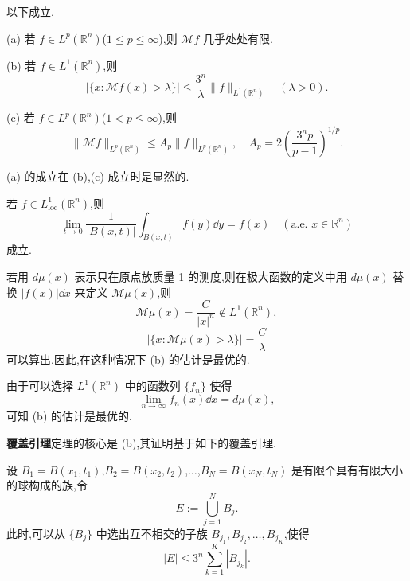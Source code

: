 \begin{theorem}\label{thm:4.1.1}
以下成立.

(a) 若 $f \in L^{p}(\mathbb{R}^{n})$($1 \leq p \leq \infty$),则 $\mathcal{M}f$ 几乎处处有限.

(b) 若 $f \in L^{1}(\mathbb{R}^{n})$,则
\begin{equation*}
|\{x: \mathcal{M}f(x) > \lambda\}| \leq \frac{3^{n}}{\lambda}\|f\|_{L^{1}(\mathbb{R}^{n})} \quad (\lambda > 0).
\end{equation*}

(c) 若 $f \in L^{p}(\mathbb{R}^{n})$($1 < p \leq \infty$),则
\begin{equation*}
\|\mathcal{M}f\|_{L^{p}(\mathbb{R}^{n})} \leq A_{p}\|f\|_{L^{p}(\mathbb{R}^{n})}, \quad A_{p} = 2\left(\frac{3^{n}p}{p-1}\right)^{1/p}.
\end{equation*}

(a) 的成立在 (b),(c) 成立时是显然的.
\end{theorem}

\begin{corollary}\label{cor:4.1.2}
若 $f \in L_{\mathrm{loc}}^{1}(\mathbb{R}^{n})$,则
\begin{equation*}
\lim_{t \to 0}\frac{1}{|B(x,t)|}\int_{B(x,t)}f(y)\dd y = f(x) \quad (\text{a.e. } x \in \mathbb{R}^{n})
\end{equation*}
成立.
\end{corollary}

若用 $d\mu(x)$ 表示只在原点放质量 1 的测度,则在极大函数的定义中用 $d\mu(x)$ 替换 $|f(x)|\dd x$ 来定义 $\mathcal{M}\mu(x)$,则
\begin{equation*}
\mathcal{M}\mu(x) = \frac{C}{|x|^{n}} \notin L^{1}(\mathbb{R}^{n}),
\end{equation*}
\begin{equation*}
|\{x: \mathcal{M}\mu(x) > \lambda\}| = \frac{C}{\lambda}
\end{equation*}
可以算出.因此,在这种情况下 (b) 的估计是最优的.

由于可以选择 $L^{1}(\mathbb{R}^{n})$ 中的函数列 $\{f_{n}\}$ 使得
\begin{equation*}
\lim_{n \to \infty}f_{n}(x)\dd x = d\mu(x),
\end{equation*}
可知 (b) 的估计是最优的.

\noindent\textbf{覆盖引理}\quad 定理的核心是 (b),其证明基于如下的覆盖引理.

\begin{lemma}\label{lem:4.1.3}
设 $B_{1} = B(x_{1},t_{1})$,$B_{2} = B(x_{2},t_{2})$,$\ldots$,$B_{N} = B(x_{N},t_{N})$ 是有限个具有有限大小的球构成的族,令
\begin{equation*}
E := \bigcup_{j=1}^{N}B_{j}.
\end{equation*}
此时,可以从 $\{B_{j}\}$ 中选出互不相交的子族 $B_{j_{1}}, B_{j_{2}}, \ldots, B_{j_{K}}$,使得
\begin{equation*}
|E| \leq 3^{n}\sum_{k=1}^{K}|B_{j_{k}}|.
\end{equation*}
\end{lemma}

